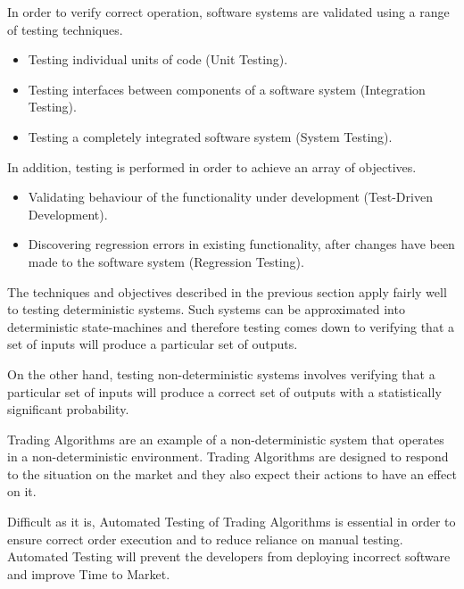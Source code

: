 
In order to verify correct operation, software systems are validated using a range of testing techniques. 

\begin{itemize}
\item Testing individual units of code (Unit Testing).
\item Testing interfaces between components of a software system (Integration Testing). 
\item Testing a completely integrated software system (System Testing).
\end{itemize}

\noindent
In addition, testing is performed in order to achieve an array of objectives.
\begin{itemize}
\item Validating behaviour of the functionality under development (Test-Driven Development). 
\item Discovering regression errors in existing functionality, after changes have been made to the software system (Regression Testing).
\end{itemize}

The techniques and objectives described in the previous section apply fairly well to testing deterministic systems. Such systems can be approximated into deterministic state-machines and therefore testing comes down to verifying that a set of inputs will produce a particular set of outputs.

On the other hand, testing non-deterministic systems involves verifying that a particular set of inputs will produce a correct set of outputs with a statistically significant probability.

Trading Algorithms are an example of a non-deterministic system that operates in a non-deterministic environment. Trading Algorithms are designed to respond to the situation on the market and they also expect their actions to have an effect on it.

Difficult as it is, Automated Testing of Trading Algorithms is essential in order to ensure correct order execution and to reduce reliance on manual testing. Automated Testing will prevent the developers from deploying incorrect software and improve Time to Market.